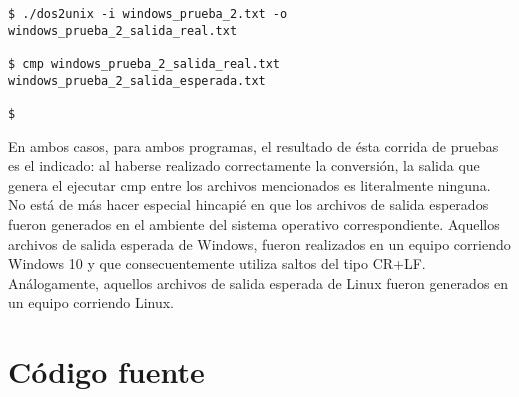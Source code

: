 \documentclass[a4paper,11pt]{article}
\begin{document}
\begin{verbatim}
$ ./dos2unix -i windows_prueba_2.txt -o windows_prueba_2_salida_real.txt

$ cmp windows_prueba_2_salida_real.txt windows_prueba_2_salida_esperada.txt

$
\end{verbatim}

En ambos casos, para ambos programas, el resultado de ésta corrida de pruebas es el indicado: al haberse realizado correctamente la conversión, la salida que genera el ejecutar cmp entre los archivos mencionados es literalmente ninguna.
No está de más hacer especial hincapié en que los archivos de salida esperados fueron generados en el ambiente del sistema operativo correspondiente. Aquellos archivos de salida esperada de Windows, fueron realizados en un equipo corriendo Windows 10 y que consecuentemente utiliza saltos del tipo CR+LF. Análogamente, aquellos archivos de salida esperada de Linux fueron generados en un equipo corriendo Linux.

\section{C\'odigo fuente}
\end{document}

